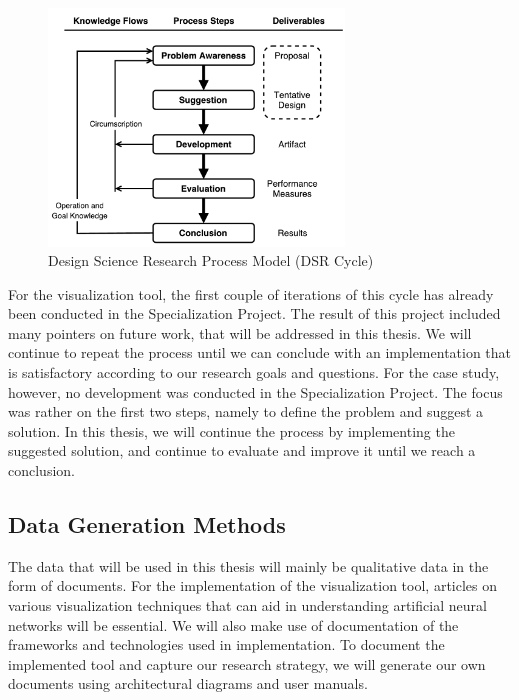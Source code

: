 \begin{figure}[h!]
    \centering
        \includegraphics[width=0.7\textwidth]{fig/dsr-cycle.pdf}
        \caption{Design Science Research Process Model (DSR Cycle)}
        \label{dsr-cycle}
\end{figure}

\noindent For the visualization tool, the first couple of iterations of this cycle has already been conducted in the Specialization Project. The result of this project included many pointers on future work, that will be addressed in this thesis. We will continue to repeat the process until we can conclude with an implementation that is satisfactory according to our research goals and questions. For the case study, however, no development was conducted in the Specialization Project. The focus was rather on the first two steps, namely to define the problem and suggest a solution. In this thesis, we will continue the process by implementing the suggested solution, and continue to evaluate and improve it until we reach a conclusion.\\

\subsection{Data Generation Methods}

The data that will be used in this thesis will mainly be qualitative data in the form of documents. For the implementation of the visualization tool, articles on various visualization techniques that can aid in understanding artificial neural networks will be essential. We will also make use of documentation of the frameworks and technologies used in implementation. To document the implemented tool and capture our research strategy, we will generate our own documents using architectural diagrams and user manuals. \\

